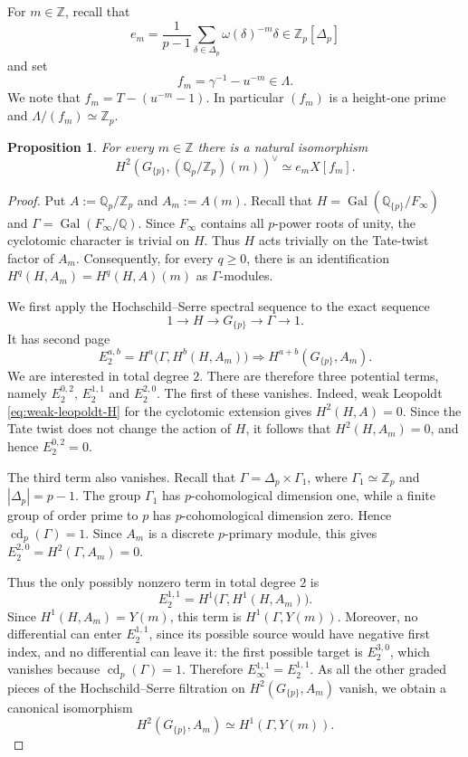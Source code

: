 \documentclass[11pt]{amsart}
\numberwithin{equation}{section}
\newcommand{\Q}{\mathbb Q}
\newcommand{\Z}{\mathbb Z}
\newcommand{\Qp}{\mathbb Q_p}
\newcommand{\Zp}{\mathbb Z_p}
\newcommand{\Gal}{\operatorname{Gal}}
\newtheorem{proposition}[theorem]{Proposition}
\theoremstyle{definition}
\begin{document}
For $m\in\Z$, recall that
\[
 e_m=\frac{1}{p-1}
 \sum_{\delta\in\Delta_p}\omega(\delta)^{-m}\delta
 \in\Zp[\Delta_p]
\]
and set
\[
 f_m=\gamma^{-1}-u^{-m}\in\Lambda.
\]
We note that $f_m=T-(u^{-m}-1)$. In particular $(f_m)$ is a height-one prime and $\Lambda/(f_m)\simeq\Zp$.

\begin{proposition}\label{prop:cyclotomic-specialization}
For every $m\in\Z$ there is a natural isomorphism
\begin{equation}\label{eq:H2-specialization}
 H^2\!\left(G_{\{p\}},(\Qp/\Zp)(m)\right)^\vee
 \simeq e_mX[f_m].
\end{equation}
\end{proposition}

\begin{proof}
Put $A:=\Qp/\Zp$ and $A_m:=A(m)$. Recall that
$H=\Gal(\Q_{\{p\}}/F_\infty)$ and
$\Gamma=\Gal(F_\infty/\Q)$. Since $F_\infty$ contains all
$p$-power roots of unity, the cyclotomic character is trivial on
$H$. Thus $H$ acts trivially on the Tate-twist factor of $A_m$.
Consequently, for every $q\geq0$, there is an identification
$H^q(H,A_m)=H^q(H,A)(m)$ as $\Gamma$-modules. 

We first apply the Hochschild--Serre spectral sequence to the exact
sequence
\[
 1\longrightarrow H\longrightarrow G_{\{p\}}
 \longrightarrow\Gamma\longrightarrow1.
\]
It has second page
\[
 E_2^{a,b}
 =
 H^a\bigl(\Gamma,H^b(H,A_m)\bigr)
 \Longrightarrow
 H^{a+b}(G_{\{p\}},A_m).
\]
We are interested in total degree $2$. There are therefore three
potential terms, namely $E_2^{0,2}$, $E_2^{1,1}$ and $E_2^{2,0}$. The first of these vanishes. Indeed, weak Leopoldt \eqref{eq:weak-leopoldt-H} for the
cyclotomic extension gives $H^2(H,A)=0$. Since the Tate twist does
not change the action of $H$, it follows that $H^2(H,A_m)=0$, and
hence $E_2^{0,2}=0$.

The third term also vanishes. Recall that
$\Gamma=\Delta_p\times\Gamma_1$, where $\Gamma_1\simeq\Zp$ and
$|\Delta_p|=p-1$. The group $\Gamma_1$ has $p$-cohomological
dimension one, while a finite group of order prime to $p$ has
$p$-cohomological dimension zero. Hence
$\operatorname{cd}_p(\Gamma)=1$. Since $A_m$ is a discrete
$p$-primary module, this gives
$E_2^{2,0}=H^2(\Gamma,A_m)=0$.

Thus the only possibly nonzero term in total degree $2$ is
\[
 E_2^{1,1}
 =
 H^1\bigl(\Gamma,H^1(H,A_m)\bigr).
\]
Since $H^1(H,A_m)=Y(m)$, this term is
$H^1(\Gamma,Y(m))$. Moreover, no differential can enter
$E_2^{1,1}$, since its possible source would have negative first
index, and no differential can leave it: the first possible target
is $E_2^{3,0}$, which vanishes because
$\operatorname{cd}_p(\Gamma)=1$. Therefore
$E_\infty^{1,1}=E_2^{1,1}$. As all the other graded pieces of the
Hochschild--Serre filtration on $H^2(G_{\{p\}},A_m)$ vanish, we
obtain a canonical isomorphism
\begin{equation}\label{eq:HS-H2}
 H^2(G_{\{p\}},A_m)
 \simeq H^1(\Gamma,Y(m)).
\end{equation}


\end{proof}
\end{document}
